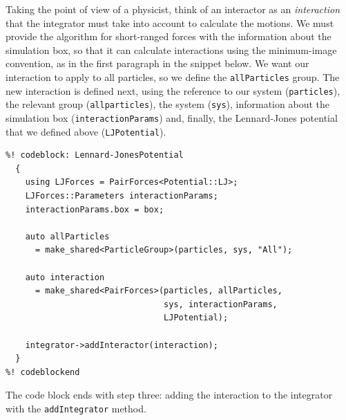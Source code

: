 Taking the point of view of a physicist, think of an interactor as an 
\textit{interaction} that the integrator must take into account to calculate the 
motions. We must provide the algorithm for short-ranged forces with the 
information about the simulation box, so that it can calculate interactions 
using the minimum-image convention, as in the first paragraph in the snippet 
below. We want our interaction to apply to all particles, so we define the 
\texttt{allParticles} group. The new interaction is defined next, using the 
reference to our system (\texttt{particles}), the relevant group 
(\texttt{allparticles}), the system (\texttt{sys}), information about the
simulation box (\texttt{interactionParams}) and, finally, the Lennard-Jones
potential that we defined above (\texttt{LJPotential}).
\begin{lstlisting}
%! codeblock: Lennard-JonesPotential
  {
    using LJForces = PairForces<Potential::LJ>;
    LJForces::Parameters interactionParams;
    interactionParams.box = box;

    auto allParticles
      = make_shared<ParticleGroup>(particles, sys, "All");

    auto interaction
      = make_shared<PairForces>(particles, allParticles,
                                sys, interactionParams,
                                LJPotential);

    integrator->addInteractor(interaction);
  }
%! codeblockend
\end{lstlisting}
The code block ends with step three: adding the interaction to the integrator
with the \texttt{addIntegrator} method.

